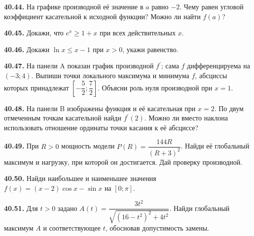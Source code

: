 \noindent\begin{minipage}[t]{\linewidth}\textbf{40.44.} На графике производной её значение в \(a\) равно \(-2\). Чему равен угловой коэффициент касательной к исходной функции? Можно ли найти \(f(a)\)?\par\end{minipage}\par
\noindent\begin{minipage}[t]{\linewidth}\textbf{40.45.}\starmark{} Докажи, что \(e^x\ge1+x\) при всех действительных \(x\).\par\end{minipage}\par
\noindent\begin{minipage}[t]{\linewidth}\textbf{40.46.}\starmark{} Докажи \(\ln x\le x-1\) при \(x>0\), укажи равенство.\par\end{minipage}\par
\noindent\begin{minipage}[t]{\linewidth}\textbf{40.47.}\starmark{} На панели A показан график производной \(f^{\prime}\); сама \(f\) дифференцируема на \((-3;4)\). Выпиши точки локального максимума и минимума \(f\), абсциссы которых принадлежат \([-\dfrac52;\dfrac72]\). Объясни роль нуля производной при \(x=1\).\par\end{minipage}\par
\noindent\begin{minipage}[t]{\linewidth}\textbf{40.48.} На панели B изображены функция и её касательная при \(x=2\). По двум отмеченным точкам касательной найди \(f^{\prime}(2)\). Можно ли вместо наклона использовать отношение ординаты точки касания к её абсциссе?\par\end{minipage}\par
\noindent\begin{minipage}[t]{\linewidth}\textbf{40.49.}\starmark{} При \(R>0\) мощность модели \(P(R)=\dfrac{144R}{(R+3)^2}\). Найди её глобальный максимум и нагрузку, при которой он достигается. Дай проверку производной.\par\end{minipage}\par
\noindent\begin{minipage}[t]{\linewidth}\textbf{40.50.}\starmark{} Найди наибольшее и наименьшее значения \(f(x)=(x-2)\cos x-\sin x\) на \([0;\pi]\).\par\end{minipage}\par
\noindent\begin{minipage}[t]{\linewidth}\textbf{40.51.}\starmark{} Для \(t>0\) задано \(A(t)=\dfrac{3t^2}{\sqrt{(16-t^2)^2+4t^2}}\). Найди глобальный максимум \(A\) и соответствующее \(t\), обосновав допустимость замены.\par\end{minipage}\par
\endgroup
